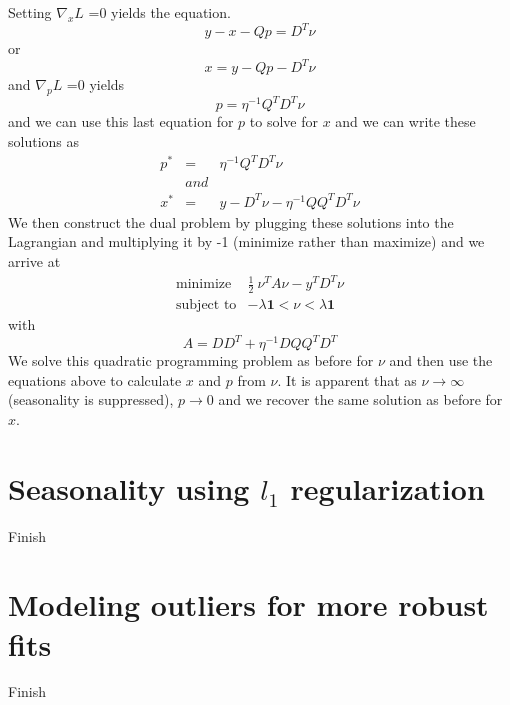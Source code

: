 \documentclass{article}
\begin{document}
Setting $\nabla_x L$ =0 yields the equation.
\[
y - x - Qp = D^T \nu
\] or
\[
x = y - Qp - D^T \nu
\]
and $\nabla_p L$ =0 yields
\[
p = \eta^{-1} Q^T D^T \nu
\]
and we can use this last equation for $p$ to solve for $x$ and we can write these solutions as
\begin{eqnarray}
p^* & = &  \eta^{-1} Q^T D^T \nu \\
& and & \nonumber \\
x^* & = & y - D^T \nu - \eta^{-1} Q Q^T D^T \nu
\end{eqnarray}
We then construct the dual problem by plugging these solutions into the Lagrangian and multiplying it by -1
(minimize rather than maximize) and we arrive at
\begin{eqnarray}
\mbox{minimize} & \frac{1}{2} ~ \nu^T A \nu - y^T D^T \nu \\
\mbox{subject to} & - \lambda \mathbf{1} < \nu < \lambda \mathbf{1}
\end{eqnarray}
with
\[
A = D D^T + \eta^{-1} D Q Q^T D^T
\]
We solve this quadratic programming problem as before for $\nu$ and then use the equations above
to calculate $x$ and $p$ from $\nu$. It is apparent that as $\nu \rightarrow \infty$ (seasonality is suppressed),
$p \rightarrow 0$ and we recover the same solution as before for $x$.

\section{Seasonality using $l_1$ regularization}
Finish

\section{Modeling outliers for more robust fits}
Finish
\end{document}
